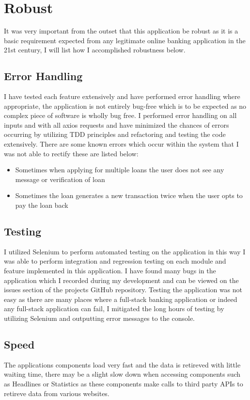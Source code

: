 \section{Robust}
It was very important from the outset that this application be robust as it is a basic requirement expected from any legitimate online banking application in the 21st century, I will list how I accomplished robustness below.
\subsection{Error Handling}
I have tested each feature extensively and have performed error handling where appropriate,
the application is not entirely bug-free which is to be expected as no complex piece of software
is wholly bug free.  I performed error handling on all inputs and with all axios requests and have
minimized the chances of errors occurring by utilizing TDD principles and refactoring and testing
the code extensively.  There are some known errors which occur within the system that I was not able to
rectify these are listed below:
\begin{itemize}
  \item Sometimes when applying for multiple loans the user does not see any message or verification of loan
  \item Sometimes the loan generates a new transaction twice when the user opts to pay the loan back
\end{itemize}
\subsection{Testing}
I utilized Selenium to perform automated testing on the application in this way I was able to perform
integration and regression testing on each module and feature implemented in this application.  I have
found many bugs in the application which I recorded during my development and can be viewed on the issues section
of the projects GitHub repository.  Testing the application was not easy as there are many places where a full-stack
banking application or indeed any full-stack application can fail, I mitigated the long hours of testing by utilizing
Selenium and outputting error messages to the console.
\subsection{Speed}
The applications components load very fast and the data is retireved with little waiting time, there may be a slight slow down when accessing components such as Headlines or Statistics as these components make calls to third party APIs to retireve data from various websites.
